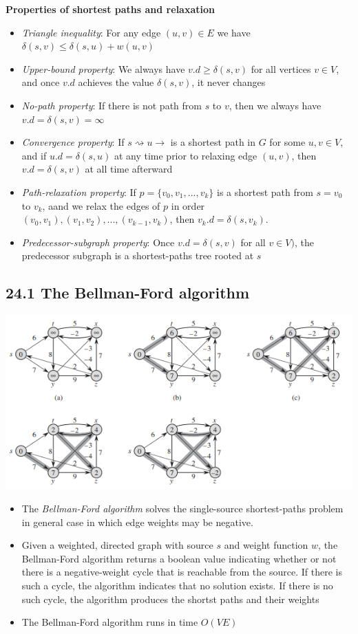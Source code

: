 \documentclass{report}
\begin{document}
\textbf{Properties of shortest paths and relaxation}
\begin{itemize}
    \item \textit{Triangle inequality}: For any edge $(u, v) \in E$ we have $\delta(s, v) \leq \delta(s, u) + w(u, v)$
    \item \textit{Upper-bound property}: We always have $v.d \geq \delta(s, v)$ for all vertices $v \in V$, and once $v.d$ achieves the value $\delta(s, v)$, it never changes
    \item \textit{No-path property}: If there is not path from $s$ to $v$, then we always have $v.d = \delta(s, v) = \infty$
    \item \textit{Convergence property}: If $s \rightsquigarrow u \rightarrow$ is a shortest path in $G$ for some $u, v \in V$, and if $u.d = \delta(s, u)$ at any time prior to relaxing edge $(u, v)$, then $v.d = \delta(s, v)$ at all time afterward
    \item \textit{Path-relaxation property}: If $p = \{v_0, v_1, ..., v_k\}$ is a shortest path from $s = v_0$ to $v_k$, aand we relax the edges of $p$ in order $(v_0, v_1), (v_1, v_2), ..., (v_{k - 1}, v_k)$, then $v_k.d = \delta(s, v_k)$.
    \item \textit{Predecessor-subgraph property}: Once $v.d = \delta(s, v)$ for all $v \in V)$, the predecessor subgraph is a shortest-paths tree rooted at $s$
\end{itemize}
\subsection*{24.1 The Bellman-Ford algorithm}
\begin{center}
    \includegraphics[width = 8 cm]{../entities/bellman_ford.png}
\end{center}
\begin{itemize}
    \item The \textit{Bellman-Ford algorithm} solves the single-source shortest-paths problem in general case in which edge weights may be negative.
    \item Given a weighted, directed graph with source $s$ and weight function $w$, the Bellman-Ford algorithm returns a boolean value indicating whether or not there is a negative-weight cycle that is reachable from the source. If there is such a cycle, the algorithm indicates that no solution exists. If there is no such cycle, the algorithm produces the shortst paths and their weights 
    \item The Bellman-Ford algorithm runs in time $O(VE)$
\end{itemize}
\end{document}

